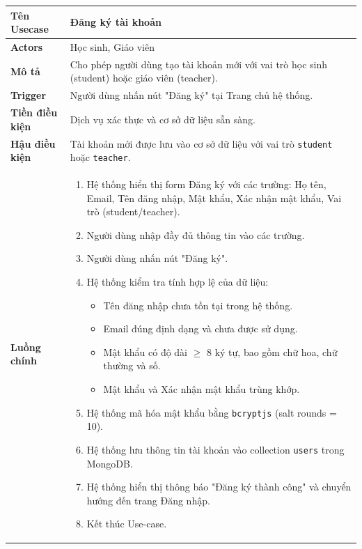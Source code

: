 \begin{longtable}{|p{}|p{}|}
\hline
\textbf{Tên Usecase} & \textbf{Đăng ký tài khoản} \\
\hline
\textbf{Actors} & Học sinh, Giáo viên \\
\hline
\textbf{Mô tả} & Cho phép người dùng tạo tài khoản mới với vai trò học sinh (student) hoặc giáo viên (teacher). \\
\hline
\textbf{Trigger} & Người dùng nhấn nút "Đăng ký" tại Trang chủ hệ thống. \\
\hline
\textbf{Tiền điều kiện} & Dịch vụ xác thực và cơ sở dữ liệu sẵn sàng. \\
\hline
\textbf{Hậu điều kiện} & Tài khoản mới được lưu vào cơ sở dữ liệu với vai trò \texttt{student} hoặc \texttt{teacher}. \\
\hline
\textbf{Luồng chính} &
\vspace{-\baselineskip}
\begin{enumerate}[topsep=2pt, itemsep=0pt]
    \item Hệ thống hiển thị form Đăng ký với các trường: Họ tên, Email, Tên đăng nhập, Mật khẩu, Xác nhận mật khẩu, Vai trò (student/teacher).
    \item Người dùng nhập đầy đủ thông tin vào các trường.
    \item Người dùng nhấn nút "Đăng ký".
    \item Hệ thống kiểm tra tính hợp lệ của dữ liệu:
    \begin{itemize}[topsep=0pt, itemsep=0pt]
        \item Tên đăng nhập chưa tồn tại trong hệ thống.
        \item Email đúng định dạng và chưa được sử dụng.
        \item Mật khẩu có độ dài $\geq$ 8 ký tự, bao gồm chữ hoa, chữ thường và số.
        \item Mật khẩu và Xác nhận mật khẩu trùng khớp.
    \end{itemize}
    \item Hệ thống mã hóa mật khẩu bằng \texttt{bcryptjs} (salt rounds = 10).
    \item Hệ thống lưu thông tin tài khoản vào collection \texttt{users} trong MongoDB.
    \item Hệ thống hiển thị thông báo "Đăng ký thành công" và chuyển hướng đến trang Đăng nhập.
    \item Kết thúc Use-case.
\end{enumerate} \\
\hline

\end{longtable}
